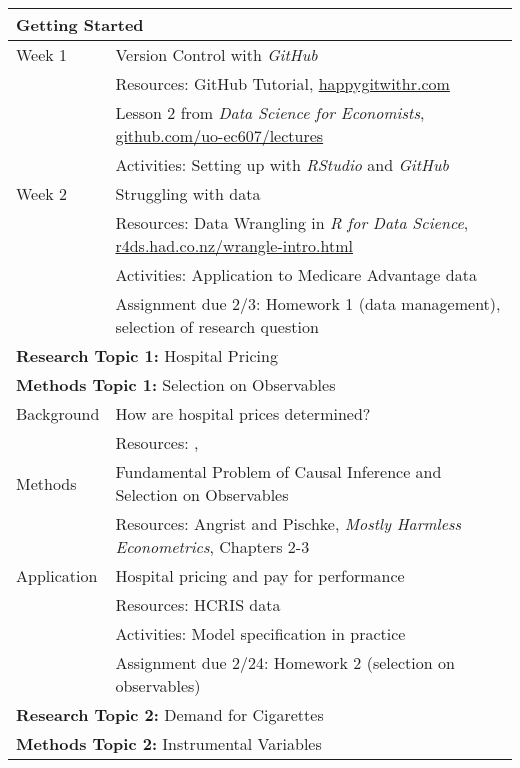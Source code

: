 \documentclass{article}
\begin{document}
\begin{longtable}{lp{13cm}}
  \hline
  \multicolumn{2}{l}{\textbf{Getting Started}} \\
  \hline\hline
  Week 1 & Version Control with \textit{GitHub} \\
         & Resources: GitHub Tutorial, \href{https://happygitwithr.com/}{happygitwithr.com} \\
         & \hspace{.4in} Lesson 2 from \textit{Data Science for Economists}, \href{https://github.com/uo-ec607/lectures}{github.com/uo-ec607/lectures} \\
         & Activities: Setting up with \textit{RStudio} and \textit{GitHub} \\
  \hline
  Week 2 & Struggling with data \\
         & Resources: Data Wrangling in \textit{R for Data Science}, \href{https://r4ds.had.co.nz/wrangle-intro.html}{r4ds.had.co.nz/wrangle-intro.html} \\
         & Activities: Application to Medicare Advantage data \\
         & Assignment due 2/3: Homework 1 (data management), selection of research question\\
  \hline
  \multicolumn{2}{l}{\textbf{Research Topic 1:} Hospital Pricing} \\
  \multicolumn{2}{l}{\textbf{Methods Topic 1:} Selection on Observables} \\
  \hline\hline
  Background & How are hospital prices determined? \\
             & Resources: \cite{cooper2017}, \cite{darden2018} \\
  \hline
  Methods & Fundamental Problem of Causal Inference and Selection on Observables \\
          & Resources: Angrist and Pischke, \textit{Mostly Harmless Econometrics}, Chapters 2-3 \\
  \hline
  Application & Hospital pricing and pay for performance \\
              & Resources: HCRIS data \\
              & Activities: Model specification in practice \citep{darden2018} \\
              & Assignment due 2/24: Homework 2 (selection on observables) \\
  \hline
  \multicolumn{2}{l}{\textbf{Research Topic 2:} Demand for Cigarettes} \\
  \multicolumn{2}{l}{\textbf{Methods Topic 2:} Instrumental Variables} \\

\end{longtable}
\end{document}

